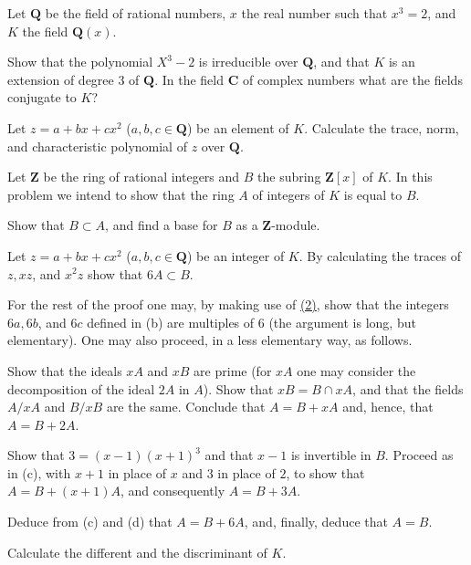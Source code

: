 

Let $\mathbf{Q}$ be the field of rational numbers, $x$ the real number such
that $x^{3}=2$, and $K$ the field $\mathbf{Q}(x)$.

 Show that the polynomial $X^{3}-2$ is irreducible over
$\mathbf{Q}$, and that $K$ is an extension of degree $3$ of $\mathbf{Q}$. In
the field $\mathbf{C}$ of complex numbers what are the fields conjugate to
$K$?

 Let $z=a+bx+cx^{2}$ ($a,b,c\in\mathbf{Q}$) be an element of $K$.
Calculate the trace, norm, and characteristic polynomial of $z$ over
$\mathbf{Q}$.

 Let $\mathbf{Z}$ be the ring of rational integers and $B$ the
subring $\mathbf{Z}[x]$ of $K$. In this problem we intend to show that the
ring $A$ of integers of $K$ is equal to $B$.
\begin{alist}
\item Show that $B\subset A$, and find a base for $B$ as a
$\mathbf{Z}$-module.
\item Let $z=a+bx+cx^{2}$ ($a,b,c\in\mathbf{Q}$) be an integer of $K$. By
calculating the traces of $z,xz$, and $x^{2}z$ show that
$6A\subset B$.
\end{alist}

For the rest of the proof one may, by making use of \hyperref[exer:R2.2]{(2)}, show that the
integers $6a,6b$, and $6c$ defined in (b) are multiples of $6$ (the argument
is long, but elementary). One may also proceed, in a less elementary way, as
follows.
\begin{alist}
\item Show that the ideals $xA$ and $xB$ are prime (for $xA$ one may
consider the decomposition of the ideal $2A$ in $A$). Show that
$xB=B\cap xA$, and that the fields $A/xA$ and $B/xB$ are the same. Conclude
that $A=B+xA$ and, hence, that $A=B+2A$.
\item Show that $3=(x-1)(x+1)^{3}$ and that $x-1$ is invertible in $B$.
Proceed as in (c), with $x+1$ in place of $x$ and $3$ in place of $2$, to
show that $A=B+(x+1)A$, and consequently $A=B+3A$.
\item Deduce from (c) and (d) that $A=B+6A$, and, finally, deduce that
$A=B$.
\end{alist}

 Calculate the different and the discriminant of $K$.

